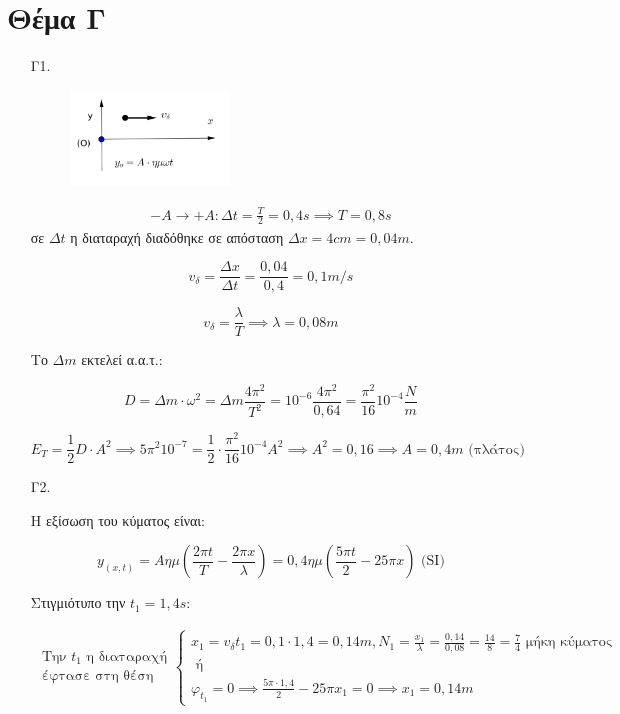 \documentclass[12pt]{article}
\begin{document}
  \section*{Θέμα Γ}
  \begin{enumerate}
    \item [Γ1.]

    \begin{figure}[h]
      \includegraphics[width=0.4\textwidth]{ΦυσικήΓ1.png}
      \centering
    \end{figure}

      \begin{gather*}
        -A \to +A: Δt=\frac{T}{2}=0,4s\implies T=0,8s
      \end{gather*}
      σε $Δt$ η διαταραχή διαδόθηκε σε απόσταση $Δx=4cm=0,04m$.

      $$v_δ=\frac{Δx}{Δt}=\frac{0,04}{0,4}=0,1m/s$$

      $$v_δ=\frac{λ}{T}\implies λ=0,08m$$

      Το $Δm$ εκτελεί α.α.τ.:

      $$D=Δm\cdot ω^2=Δm\frac{4\pi^2}{T^2}=10^{-6}\frac{4\pi^2}{0,64}=\frac{\pi^2}{16}10^{-4}\frac{N}{m}$$

      $$E_T=\frac{1}{2}D\cdot A^2\implies 5\pi^2 10^{-7}=\frac{1}{2}\cdot\frac{\pi^2}{16}10^{-4}A^2\implies A^2=0,16\implies A=0,4m \text{ (πλάτος)}$$

    \item [Γ2.]

    Η εξίσωση του κύματος είναι:

    $$y_{(x,t)}=Aημ\left(\frac{2\pi t}{T}-\frac{2\pi x}{λ}\right)=0,4ημ\left(\frac{5\pi t}{2}-25\pi x \right) \text{ (SI)}$$

    Στιγμιότυπο την $t_1=1,4s$:

    \begin{gather*}
      \begin{matrix}
        \text{Την }t_1 \text{ η διαταραχή} \\ \text{έφτασε στη θέση }
      \end{matrix}
       \left\{ \begin{matrix}
        x_1=v_δ t_1=0,1\cdot 1,4=0,14m, N_1=\frac{x_1}{λ}=\frac{0,14}{0,08}=\frac{14}{8}=\frac{7}{4} \text{ μήκη κύματος} \\
        \text{ ή } \\
        φ_{t_1}=0\implies \frac{5\pi \cdot 1,4}{2}-25\pi x_1=0\implies x_1=0,14m
      \end{matrix} \right.
    \end{gather*}


\end{enumerate}
\end{document}
